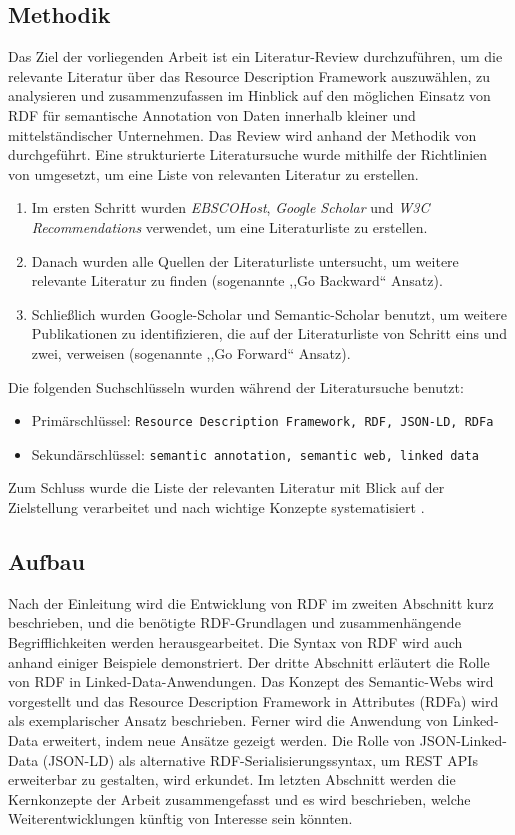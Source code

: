 \subsection{Methodik}
Das Ziel der vorliegenden Arbeit ist ein Literatur-Review durchzuführen, um die relevante Literatur über das Resource Description Framework auszuwählen, zu analysieren und zusammenzufassen im Hinblick auf den möglichen Einsatz von RDF für semantische Annotation von Daten innerhalb kleiner und mittelständischer Unternehmen. Das Review wird anhand der Methodik von \cite{fettke2006state} durchgeführt. Eine strukturierte Literatursuche wurde mithilfe der Richtlinien von \cite[S. XVI]{webster2002analyzing} umgesetzt, um eine Liste von relevanten Literatur zu erstellen. 
\begin{enumerate}
	\item Im ersten Schritt wurden \emph{EBSCOHost}, \emph{Google Scholar} und \emph{W3C Recommendations} verwendet, um eine Literaturliste zu erstellen.
	\item Danach wurden alle Quellen der Literaturliste untersucht, um weitere relevante Literatur zu finden (sogenannte ,,Go Backward`` Ansatz).
	\item Schließlich wurden Google-Scholar und Semantic-Scholar benutzt, um weitere Publikationen zu identifizieren, die auf der Literaturliste von Schritt eins und zwei, verweisen (sogenannte ,,Go Forward`` Ansatz).
\end{enumerate}
Die folgenden Suchschlüsseln wurden während der Literatursuche benutzt:
\begin{itemize}
	\item Primärschlüssel: \texttt{Resource Description Framework, RDF, JSON-LD, RDFa}
	\item Sekundärschlüssel: \texttt{semantic annotation, semantic web, linked data}
\end{itemize}
Zum Schluss wurde die Liste der relevanten Literatur mit Blick auf der Zielstellung verarbeitet und nach wichtige Konzepte systematisiert \parencite[vgl.][S. XVI]{webster2002analyzing}.
\subsection{Aufbau}
Nach der Einleitung wird die Entwicklung von RDF im zweiten Abschnitt kurz beschrieben, und die benötigte RDF-Grundlagen und zusammenhängende Begrifflichkeiten werden herausgearbeitet. Die Syntax von RDF wird auch anhand einiger Beispiele demonstriert. Der dritte Abschnitt erläutert die Rolle von RDF in Linked-Data-Anwendungen. Das Konzept des Semantic-Webs wird vorgestellt und das Resource Description Framework in Attributes (RDFa) wird als exemplarischer Ansatz beschrieben. Ferner wird die Anwendung von Linked-Data erweitert, indem neue Ansätze gezeigt werden. Die Rolle von JSON-Linked-Data (JSON-LD) als alternative RDF-Serialisierungssyntax, um REST APIs erweiterbar zu gestalten, wird erkundet. Im letzten Abschnitt werden die Kernkonzepte der Arbeit zusammengefasst und es wird beschrieben, welche Weiterentwicklungen künftig von Interesse sein könnten.